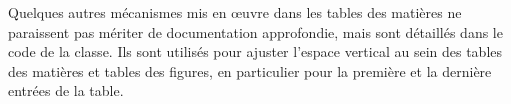 


Quelques autres mécanismes mis en œuvre dans les tables des matières ne paraissent pas mériter de documentation approfondie, mais sont détaillés dans le code de la classe. Ils sont utilisés pour ajuster l'espace vertical au sein des tables des matières et tables des figures, en particulier pour la première et la dernière entrées de la table.

\begin{noprint}
\setcftvspacecmd{\addvspace}
\end{noprint}

\begin{noprint}
\end{noprint}



